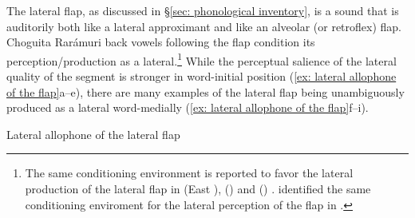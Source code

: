 The lateral flap, as discussed in §\ref{sec: phonological inventory}, is a sound that is auditorily both like a lateral approximant and like an alveolar (or retroflex) flap. Choguita Rarámuri back vowels following the flap condition its perception/production as a lateral.\footnote{The same conditioning environment is reported to favor the lateral production of the lateral flap in  (East ),  () and  () \citep[][243]{ladefoged1996sounds}. \citet{lionnet1972elementos} identified the same conditioning enviroment for the lateral perception of the flap in .} While the perceptual salience of the lateral quality of the segment is stronger in word-initial position (\ref{ex: lateral allophone of the flap}a--e), there are many examples of the lateral flap being unambiguously produced as a lateral word-medially (\ref{ex: lateral allophone of the flap}f--i).

\ea\label{ex: lateral allophone of the flap}
{Lateral allophone of  the lateral flap}

